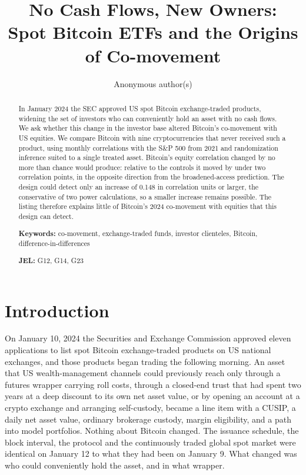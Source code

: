\documentclass[12pt,a4paper]{article}
\title{No Cash Flows, New Owners:\\ Spot Bitcoin ETFs and the Origins of Co-movement}
\author{Anonymous author(s)}
\date{}
\begin{document}
\maketitle

\begin{abstract}
\noindent In January 2024 the SEC approved US spot Bitcoin exchange-traded products, widening the set of investors who can conveniently hold an asset with no cash flows. We ask whether this change in the investor base altered Bitcoin's co-movement with US equities. We compare Bitcoin with nine cryptocurrencies that never received such a product, using monthly correlations with the S\&P 500 from 2021 and randomization inference suited to a single treated asset. Bitcoin's equity correlation changed by no more than chance would produce: relative to the controls it moved by under two correlation points, in the opposite direction from the broadened-access prediction.
The design could detect only an increase of 0.148 in correlation units or larger, the conservative of two power calculations, so a smaller increase remains possible.
The listing therefore explains little of Bitcoin's 2024 co-movement with equities that this design can detect.

\medskip
\noindent\textbf{Keywords:} co-movement, exchange-traded funds, investor clienteles, Bitcoin, difference-in-differences

\noindent\textbf{JEL:} G12, G14, G23
\end{abstract}

\newpage
\onehalfspacing

\section{Introduction}

On January 10, 2024 the Securities and Exchange Commission approved eleven applications to list spot Bitcoin exchange-traded products on US national exchanges, and those products began trading the following morning.
An asset that US wealth-management channels could previously reach only through a futures wrapper carrying roll costs, through a closed-end trust that had spent two years at a deep discount to its own net asset value, or by opening an account at a crypto exchange and arranging self-custody, became a line item with a CUSIP, a daily net asset value, ordinary brokerage custody, margin eligibility, and a path into model portfolios. Nothing about Bitcoin changed. The issuance schedule, the block interval, the protocol and the continuously traded global spot market were identical on January 12 to what they had been on January 9. What changed was who could conveniently hold the asset, and in what wrapper.
\end{document}
